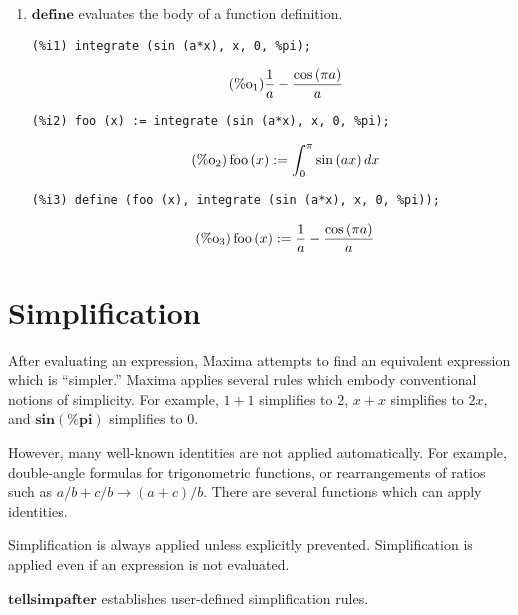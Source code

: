 \documentclass[12pt,leqno]{article}
\begin{document}
\begin{enumerate}
\item $\mathbf{define}$ evaluates the body of a function definition.
\begin{verbatim}
(%i1) integrate (sin (a*x), x, 0, %pi);
\end{verbatim}
\begin{equation}
\tag{$\mathop{\mathrm{\%o}}_{1}$}\frac{1}{a}-\frac{\cos \left(\pi a\right)}{a}
\label{eq:doc-group1-code20-1-1}
\end{equation}
\begin{verbatim}
(%i2) foo (x) := integrate (sin (a*x), x, 0, %pi);
\end{verbatim}
\begin{equation}
\tag{$\mathop{\mathrm{\%o}}_{2}$}\mathop{\mathrm{foo}}\left(x\right) := \int_{0}^{\pi}\sin \left(a x\right)\mathop{dx}
\label{eq:doc-group1-code20-2-1}
\end{equation}
\begin{verbatim}
(%i3) define (foo (x), integrate (sin (a*x), x, 0, %pi));
\end{verbatim}
\begin{equation}
\tag{$\mathop{\mathrm{\%o}}_{3}$}\mathop{\mathrm{foo}}\left(x\right) := \frac{1}{a}-\frac{\cos \left(\pi a\right)}{a}
\label{eq:doc-group1-code20-3-1}
\end{equation}


\end{enumerate}

\section{Simplification}

After evaluating an expression,
Maxima attempts to find an equivalent expression which is ``simpler.''
Maxima applies several rules which embody conventional notions of simplicity.
For example,
$1 + 1$ simplifies to $2$,
$x + x$ simplifies to $2 x$,
and $\mathbf{sin}(\mathbf{\%pi})$ simplifies to $0$.

However,
many well-known identities are not applied automatically.
For example,
double-angle formulas for trigonometric functions,
or rearrangements of ratios such as $a/b + c/b \rightarrow (a + c)/b$.
There are several functions which can apply identities.

Simplification is always applied unless explicitly prevented.
Simplification is applied even if an expression is not evaluated.

$\mathbf{tellsimpafter}$ establishes user-defined simplification rules.
\end{document}
